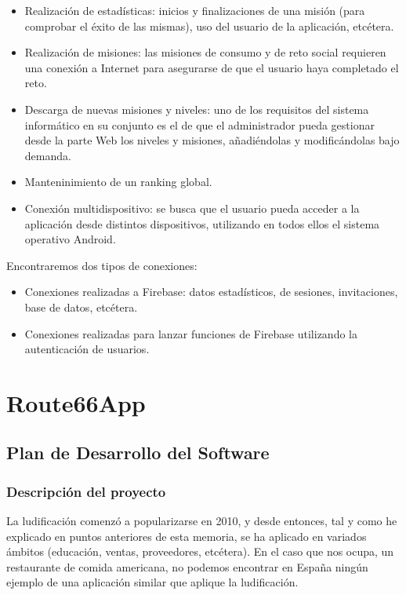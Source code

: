 \documentclass[twoside]{report}
\begin{document}
\begin{itemize}
\item Realización de estadísticas: inicios y finalizaciones de una misión (para comprobar el éxito de las mismas), uso del usuario de la aplicación, etcétera.

\item Realización de misiones: las misiones de consumo y de reto social requieren una conexión a Internet para asegurarse de que el usuario haya completado el reto.

\item Descarga de nuevas misiones y niveles: uno de los requisitos del sistema informático en su conjunto es el de que el administrador pueda gestionar desde la parte Web los niveles y misiones, añadiéndolas y modificándolas bajo demanda.

\item Manteninimiento de un ranking global.

\item Conexión multidispositivo: se busca que el usuario pueda acceder a la aplicación desde distintos dispositivos, utilizando en todos ellos el sistema operativo Android.
\end{itemize}

Encontraremos dos tipos de conexiones:

\begin{itemize}
\item Conexiones realizadas a Firebase: datos estadísticos, de sesiones, invitaciones, base de datos, etcétera.

\item Conexiones realizadas para lanzar funciones de Firebase utilizando la autenticación de usuarios.

\end{itemize}


\chapter{Route66App}
\section{Plan de Desarrollo del Software}
\subsection{Descripción del proyecto}

La ludificación comenzó a popularizarse en 2010\cite{anatfg}, y desde entonces, tal y como he explicado en puntos anteriores de esta memoria, se ha aplicado en variados ámbitos (educación, ventas, proveedores, etcétera). En el caso que nos ocupa, un restaurante de comida americana, no podemos encontrar en España ningún ejemplo de una aplicación similar que aplique la ludificación.
\end{document}
